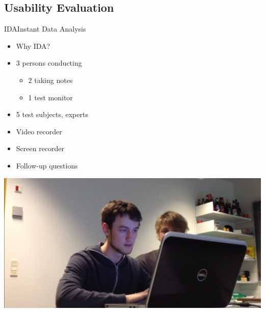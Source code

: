 \subsection{Usability Evaluation} 
\begin{frame}{IDA}{Instant Data Analysis}
	\begin{itemize}
        \item Why IDA?
		\item 3 persons conducting
		\begin{itemize}
            \item 2 taking notes
            \item 1 test monitor
		\end{itemize}
        \item 5 test subjects, experts
		\item Video recorder
		\item Screen recorder
		\item Follow-up questions
	\end{itemize}
    \includegraphics[scale=0.2]{./graphics/UsabilityTest_Screenshot01}
\end{frame}

